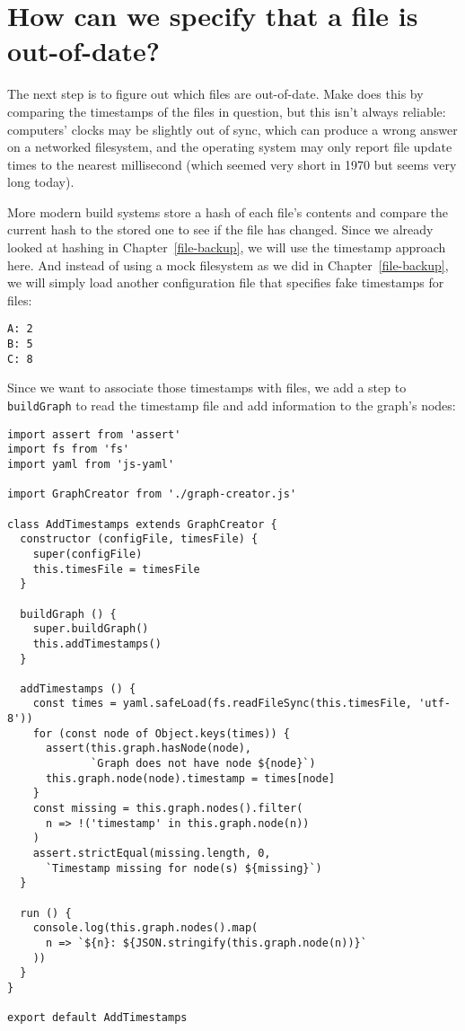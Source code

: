 \documentclass[krantzl]{krantz}
\newcommand{\chapref}[1]{Chapter~\ref{#1}}
\begin{document}
\section{How can we specify that a file is out-of-date?}\label{build-manager-timestamp}


The next step is to figure out which files are out-of-date.
Make does this by comparing the timestamps of the files in question,
but this isn’t always reliable:
computers’ clocks may be slightly out of sync,
which can produce a wrong answer on a networked filesystem,
and the operating system may only report file update times to the nearest millisecond
(which seemed very short in 1970 but seems very long today).


More modern build systems store a hash of each file’s contents
and compare the current hash to the stored one to see if the file has changed.
Since we already looked at hashing in \chapref{file-backup},
we will use the timestamp approach here.
And instead of using a mock filesystem as we did in \chapref{file-backup},
we will simply load another configuration file that specifies fake timestamps for files:


\begin{lstlisting}[frame=tblr]
A: 2
B: 5
C: 8
\end{lstlisting}



Since we want to associate those timestamps with files,
we add a step to \texttt{buildGraph} to read the timestamp file and add information to the graph’s nodes:


\begin{lstlisting}[frame=tblr]
import assert from 'assert'
import fs from 'fs'
import yaml from 'js-yaml'

import GraphCreator from './graph-creator.js'

class AddTimestamps extends GraphCreator {
  constructor (configFile, timesFile) {
    super(configFile)
    this.timesFile = timesFile
  }

  buildGraph () {
    super.buildGraph()
    this.addTimestamps()
  }

  addTimestamps () {
    const times = yaml.safeLoad(fs.readFileSync(this.timesFile, 'utf-8'))
    for (const node of Object.keys(times)) {
      assert(this.graph.hasNode(node),
             `Graph does not have node ${node}`)
      this.graph.node(node).timestamp = times[node]
    }
    const missing = this.graph.nodes().filter(
      n => !('timestamp' in this.graph.node(n))
    )
    assert.strictEqual(missing.length, 0,
      `Timestamp missing for node(s) ${missing}`)
  }

  run () {
    console.log(this.graph.nodes().map(
      n => `${n}: ${JSON.stringify(this.graph.node(n))}`
    ))
  }
}

export default AddTimestamps
\end{lstlisting}
\end{document}
